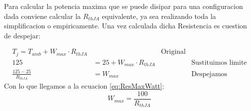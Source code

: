 
Para calcular la potencia maxima que se puede disipar para una configuracion dada conviene
calcular la $R_{thJA}$ equivalente, ya sea realizando toda la simplificacion o empiricamente.
Una vez calculada dicha Resistencia es cuestion de despejar:

\begin{align*}
	T_j=T_{amb}+W_{max} \cdot R_{thJA} & & \text{Original} \\
	125&=25+W_{max} \cdot R_{thJA} & & \text{Sustituimos limite} \\
\frac{125-25}{R_{thJA}}&=W_{max} & & \text{Despejamos}
\end{align*}
Con lo que llegamos a la ecuacion \ref{eq:ResMaxWatt}:
\begin{equation}
\label{eq:ResMaxWatt}
W_{max}=\frac{100}{R_{thJA}}
\end{equation}
